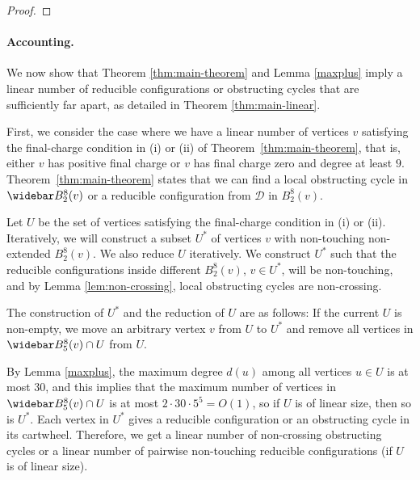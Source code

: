 \documentclass[10pt,a4paper]{article}
\renewcommand{\bar}{\widebar}
\def\cD{{\mathcal D}}
\newcommand\drop[1]{}
\begin{document}
\begin{proof}
\drop{ 
The last case is outcome (2) in Theorem \ref{thm:main-theorem}(iii), where $B_2(v)$ contains a configuration in Figure \ref{fig:flatn}.
As above, Lemma \ref{lem:induced-config} implies that the configuration is induced. 
Then the completion %
of it is contained in the cartwheel $B_3(v)$. We have required  all the vertices in $B_9(v)$  
to have degree at most $8$, so $B_3(v)=B_3^8(v)$, so we know that there is no obstructing cycle in the induced graph $B_3(v)$. 
}
\end{proof}


\paragraph{Accounting.}
We now show that Theorem \ref{thm:main-theorem} and Lemma \ref{maxplus} imply a
linear number of reducible configurations or obstructing cycles that are sufficiently far apart, as detailed in Theorem \ref{thm:main-linear}. 


First, we consider the case where we have a linear
number of vertices $v$ satisfying 
the final-charge condition in (i) or (ii) of Theorem~\ref{thm:main-theorem}, that is, either $v$ has positive final charge or $v$ has final charge zero and degree at least $9$. 
Theorem~\ref{thm:main-theorem} states that we can find a local obstructing cycle in $\bar B_2^8(v)$
or a reducible configuration from $\cD$ in $B_2^8(v)$.


Let $U$ be the set of vertices satisfying the final-charge condition in
(i) or (ii). Iteratively, we will construct a subset $U^*$ of vertices $v$ with non-touching non-extended $B_2^8(v)$. 
We also reduce $U$ iteratively. We construct $U^*$ such that the reducible configurations inside different $B_2^8(v)$, $v\in U^*$, will be non-touching, and by Lemma \ref{lem:non-crossing}, local obstructing cycles are non-crossing. 


The construction of $U^*$ and the reduction of $U$ are as follows: If the current 
$U$ is non-empty, we move an arbitrary vertex $v$ from $U$ to $U^*$ and remove all vertices in $\bar B^8_5(v)\cap U$ from $U$. 

By Lemma \ref{maxplus}, the maximum degree $d(u)$ among all vertices $u\in U$ is at most 30, and this implies that the maximum number of vertices in $\bar B^8_5(v)\cap U$ is at most $2\cdot 30\cdot 5^5=O(1)$, so if $U$ is of linear size, then so is $U^*$. Each vertex in $U^*$ gives a reducible configuration or an obstructing cycle in its cartwheel. Therefore, we get a linear number of non-crossing obstructing cycles or a linear number of pairwise non-touching reducible configurations (if $U$ is of linear size).
\end{document}
